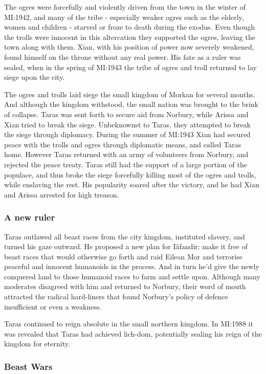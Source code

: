 The ogres were forcefully and violently driven from the town in the winter of
MI:1942, and many of the tribe - especially weaker ogres such as the
elderly, women and children - starved or froze to death during the exodus. Even
though the trolls were innocent in this altercation they supported the ogres,
leaving the town along with them. Xian, with his position of power now
severely weakened, found himself on the throne without any real power. His
fate as a ruler was sealed, when in the spring of MI:1943 the tribe of
ogres and troll returned to lay siege upon the city.

The ogres and trolls laid siege the small kingdom of Morkan for several
months. And although the kingdom withstood, the small nation was brought to
the brink of collapse. Taras was sent forth to secure aid from Norbury, while
Arissa and Xian tried to break the siege. Unbeknownst to Taras, they attempted
to break the siege through diplomacy. During the summer of MI:1943 Xian
had secured peace with the trolls and ogres through diplomatic means, and
called Taras home. However Taras returned with an army of volunteers from
Norbury, and rejected the peace treaty. Taras still had the support of a large
portion of the populace, and thus broke the siege forcefully killing most of the
ogres and trolls, while enslaving the rest. His popularity soared after the
victory, and he had Xian and Arissa arrested for high treason.

\subsubsection{A new ruler}

Taras outlawed all beast races from the city kingdom, instituted slavery,
and turned his gaze outward. He proposed a new plan for Iâfandir: make it free
of beast races that would otherwise go forth and raid Eilean Mor and terrorise
peaceful and innocent humanoids in the process. And in turn he'd give the newly
conquered land to those humanoid races to farm and settle upon. Although many
moderates disagreed with him and returned to Norbury, their word of mouth
attracted the radical hard-liners that found Norbury's policy of defence
insufficient or even a weakness.

Taras continued to reign absolute in the small northern kingdom. In MI:1988 it
was revealed that Taras had achieved lich-dom, potentially sealing his reign
of the kingdom for eternity.

\subsubsection{Beast Wars}
\label{sec:Beast Wars}

